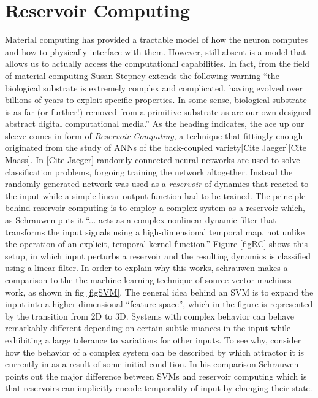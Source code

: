 \section{Reservoir Computing}
Material computing has provided a tractable model of how the neuron computes and
how to physically interface with them.
However, still absent is a model that allows us to actually access the
computational capabilities.
In fact, from the field of material computing Susan Stepney extends the
following warning ``the biological substrate is extremely complex and
complicated, having evolved over billions of years to exploit specific
properties. In some sense, biological substrate is as far (or further!) removed
from a primitive substrate as are our own designed abstract digital
computational media.''
%
As the heading indicates, the ace up our sleeve comes in form of \emph{Reservoir
  Computing}, a technique that fittingly enough originated from the study of
ANNs of the back-coupled variety[Cite Jaeger][Cite Maass].
In [Cite Jaeger] randomly connected neural networks are used to solve
classification problems, forgoing training the network altogether.
Instead the randomly generated network was used as a \emph{reservoir} of
dynamics that reacted to the input while a simple linear output function had to
be trained.
The principle behind reservoir computing is to employ a complex system as a
reservoir which, as Schrauwen puts it \cite{schrauwen_overview_2007} ``... acts
as a complex nonlinear dynamic filter that transforms the input signals using a
high-dimensional temporal map, not unlike the operation of an explicit, temporal
kernel function.''
Figure \ref{figRC} shows this setup, in which input perturbs a reservoir and the
resulting dynamics is classified using a linear filter.
%
In order to explain why this works, schrauwen makes a comparison to the the
machine learning technique of source vector machines work, as shown in fig
\ref{figSVM}. The general idea behind an SVM is to expand the input into a
higher dimensional ``feature space'', which in the figure is represented by the
transition from 2D to 3D.
Systems with complex behavior can behave remarkably different depending on
certain subtle nuances in the input while exhibiting a large tolerance to
variations for other inputs.
To see why, consider how the behavior of a complex system can be described by
which attractor it is currently in as a result of some initial condition.
%
In his comparison Schrauwen points out the major difference between SVMs and
reservoir computing which is that reservoirs can implicitly encode temporality
of input by changing their state.


